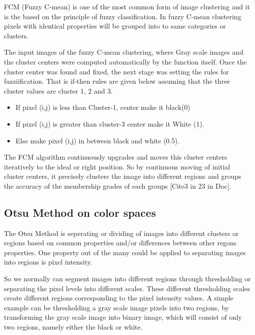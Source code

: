 \documentclass[12pt,a4paper,IEEEtran]{article}
\begin{document}
FCM (Fuzzy C-mean) \cite{BEZDEK1984191} is one of the most common form of image clustering and it is the based on the principle of fuzzy classification. In fuzzy C-mean clustering pixels with identical properties will be grouped into to same categories or clusters.

The input images of the fuzzy C-mean clustering, where Gray scale images and the cluster centers were computed automatically by the function itself. Once the cluster center was found and fixed, the next stage was setting the rules for fuzziification. That is if-then rules are given below assuming that the three cluster values are cluster 1, 2 and 3.
\begin{itemize}
	
	\item If pixel (i,j) is less than Cluster-1, center make it black(0)
	\item If pixel (i,j) is greater than cluster-3 center make it White (1).
	\item Else make pixel (i,j) in between black and white (0.5). 	
\end{itemize}

The FCM algorithm continuously upgrades and moves this cluster centers iteratively to the ideal or right position. So by continuous moving of initial cluster centers, it precisely clusters the image into different regions and groups the accuracy of the membership grades of each groups [Cite3 in 23 in Doc]. 


\subsection[3.2]{Otsu Method on color spaces}
The Otsu Method \cite{5254345} is seperating or dividing of images into different clusters or regions based on common properties and/or differences between other regons properties. One property out of the many could be applied to separating images into regions is pixel intensity. 

So we normally can segment images into different regions through thresholding or separating the pixel levels into different scales. These different thresholding scales create different regions corresponding to the pixel intensity values. 
\newline A simple example can be thresholding a gray scale image pixels into two regions, by transforming the gray scale image into binary image, which will consist of only two regions, namely either the black or white.
\end{document}

